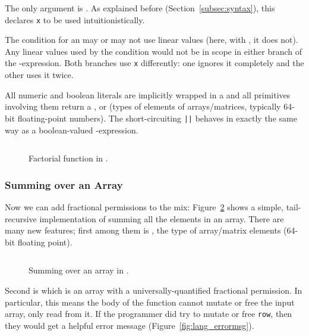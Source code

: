 The only argument is . As explained before
(Section~\ref{subsec:syntax}), this declares \texttt{x} to be used
intuitionistically.

The condition for an  may or may not use linear values (here, with
, it does not). Any linear values used by the condition
would not be in scope in either branch of the -expression.  Both
branches use \texttt{x} differently: one ignores it completely and the other
uses it twice.

All numeric and boolean literals are implicitly wrapped in a  and
all primitives involving them return a ,  or
 (types of elements of arrays/matrices, typically 64-bit
floating-point numbers). The short-circuiting \texttt{||} behaves in exactly the
same way as a boolean-valued -expression.

\begin{figure}[t]
    \centering
    \inputminted[fontsize=\small, linenos]{ocaml}{../../examples/factorial.lt}
    \caption{Factorial function in \lang.}\label{fig:lang_factorial}
\end{figure}

\subsubsection{Summing over an Array}

Now we can add fractional permissions to the mix:
Figure~\ref{fig:lang_sumarray} shows a simple, tail-recursive implementation of
summing all the elements in an array. There are many new features; first among
them is , the type of array/matrix elements (64-bit floating
point).

\begin{figure}[t]
    \centering
    \inputminted[fontsize=\small]{ocaml}{../../examples/sum_array.lt}
    \caption{Summing over an array in \lang.}\label{fig:lang_sumarray}
\end{figure}

Second is  which is an array with a
universally-quantified fractional permission. In particular, this means the
body of the function cannot mutate or free the input array, only read from it.
If the programmer did try to mutate or free \texttt{row}, then they would get a
helpful error message (Figure~\ref{fig:lang_errormsg}).

